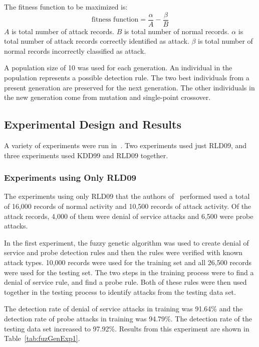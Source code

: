 \documentclass{sig-alternate}
\begin{document}
The fitness function to be maximized is:
\begin{equation*}
\textrm{fitness function} = \frac{\alpha}{A} - \frac{\beta}{B}
\end{equation*}
$A$ is total number of attack records. $B$ is total number of normal records. $\alpha$ is total number of attack records correctly identified as attack. $\beta$ is total number of normal records incorrectly classified as attack.

A population size of 10 was used for each generation. An individual in the population represents a possible detection rule. The two best individuals from a present generation are preserved for the next generation. The other individuals in the new generation come from mutation and single-point crossover.




\subsection{Experimental Design and Results}
A variety of experiments were run in~\cite{6496342, 6559603}. Two experiments used just RLD09, and three experiments used KDD99 and RLD09 together.

\subsubsection{Experiments using Only RLD09}
The experiments using only RLD09 that the authors of~\cite{6496342, 6559603} performed used a total of 16,000 records of normal activity and 10,500 records of attack activity. Of the attack records, 4,000 of them were denial of service attacks and 6,500 were probe attacks.

In the first experiment, the fuzzy genetic algorithm was used to create denial of service and probe detection rules and then the rules were verified with known attack types. 10,000 records were used for the training set and all 26,500 records were used for the testing set. The two steps in the training process were to find a denial of service rule, and find a probe rule. Both of these rules were then used together in the testing process to identify attacks from the testing data set.

The detection rate of denial of service attacks in training was 91.64\% and the detection rate of probe attacks in training was 94.79\%. The detection rate of the testing data set increased to 97.92\%. Results from this experiment are shown in Table~\ref{tab:fuzGenExp1}.
\end{document}
